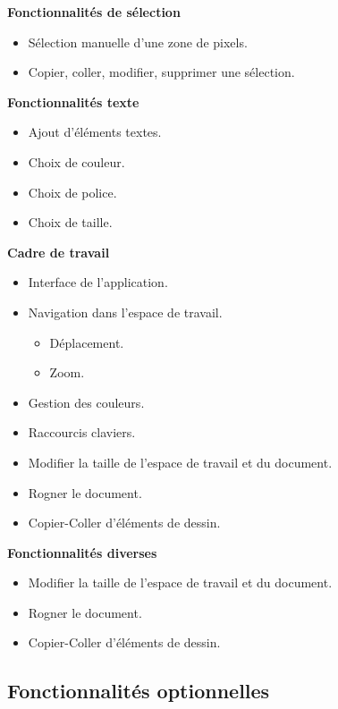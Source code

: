 \documentclass[11pt, a4paper, french]{article}
\begin{document}
			\textbf{Fonctionnalités de sélection}
			\begin{itemize}[label=\textbullet]
				\item Sélection manuelle d’une zone de pixels.
				\item Copier, coller, modifier, supprimer une sélection. \\
			\end{itemize}
	
			\textbf{Fonctionnalités texte}
			\begin{itemize}[label=\textbullet]
				\item Ajout d’éléments textes.
				\item Choix de couleur.
				\item Choix de police.
				\item Choix de taille. \\
			\end{itemize}
	
			\textbf{Cadre de travail}
			\begin{itemize}[label=\textbullet]
				\item Interface de l’application.
				\item Navigation dans l’espace de travail.
				\begin{itemize}[label=\textbullet]
					\item Déplacement.
					\item Zoom.
				\end{itemize}
				\item Gestion des couleurs.
				\item Raccourcis claviers.
				\item Modifier la taille de l’espace de travail et du document.
				\item Rogner le document.
				\item Copier-Coller d’éléments de dessin. \\
			\end{itemize}
		
			\textbf{Fonctionnalités diverses}
			\begin{itemize}[label=\textbullet]
				\item Modifier la taille de l’espace de travail et du document.
				\item Rogner le document.
				\item Copier-Coller d’éléments de dessin. \\
			\end{itemize}

		
		\subsection {Fonctionnalités optionnelles}
		
\end{document}
